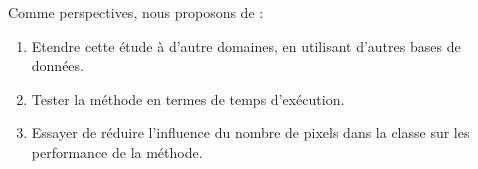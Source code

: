 Comme perspectives, nous proposons de :
\begin{enumerate}
\item Etendre cette étude à d'autre domaines, en utilisant d'autres bases de données.
\item Tester la méthode en termes de temps d'exécution.
\item Essayer de réduire l'influence du nombre de pixels dans la classe sur les performance de la méthode.
\end{enumerate}

